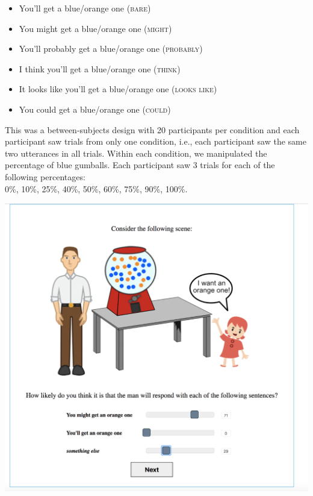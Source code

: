\documentclass[lucida,biblatex]{sp} %
\begin{document}
\begin{itemize}
\item You'll get a blue/orange one (\textsc{bare})
\item You might get a blue/orange one (\textsc{might})
\item You'll probably get a blue/orange one (\textsc{probably})
\item I think you'll get a blue/orange one (\textsc{think})
\item It looks like you'll get a blue/orange one (\textsc{looks like})
\item You could get a blue/orange one (\textsc{could})
\end{itemize}

This was a between-subjects design with 20 participants per condition and each participant saw trials from only one condition, i.e., each participant saw the same two utterances in all trials. Within each condition, we manipulated the percentage of blue gumballs. Each participant saw 3 trials for each of the following percentages: \\ 0\%, 10\%, 25\%, 40\%, 50\%, 60\%, 75\%, 90\%, 100\%.

\begin{center}
\includegraphics[width=\textwidth]{figures/pre-test-example-trial.png} 
\vspace{2em}
\end{center}
\end{document}

